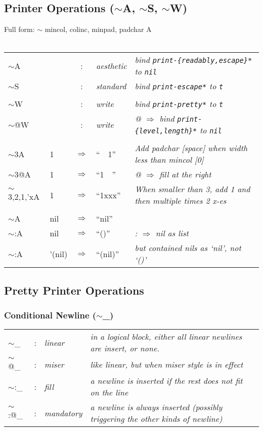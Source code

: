 \documentclass{article}
\begin{document}
\subsection{Printer Operations ($\sim$A, $\sim$S, $\sim$W)}
Full form: $\sim$ mincol, colinc, minpad, padchar A \\
\\
\begin{tabular}{llcll}
  $\sim$A   &    & : &   {\em aesthetic} & {\em bind {\tt *print-\{readably,escape\}*} to {\tt nil}} \\
  $\sim$S   &    & : &   {\em standard} & {\em bind {\tt *print-escape*} to {\tt t}} \\
\\
  $\sim$W   &    & : &   {\em write} & {\em bind {\tt *print-pretty*} to {\tt t}} \\
  $\sim$@W  &    & : &   {\em write} & {\em @ $\Rightarrow$ bind {\tt *print-\{level,length\}*} to {\tt nil}} \\
\\
  $\sim$3A   & 1 & $\Rightarrow$   & ``~~1'' & {\em Add {\em padchar} [space] when width less than {\em mincol} [0]} \\
  $\sim$3@A  & 1 & $\Rightarrow$   & ``1~~'' & {\em @ $\Rightarrow$ fill at the right} \\
  $\sim$3,2,1,'xA & 1 & $\Rightarrow$ & ``1xxx'' & {\em When smaller than 3, add 1 and then multiple times 2 {\em x}-es} \\
\\
  $\sim$A   & nil & $\Rightarrow$   & ``nil'' \\
  $\sim$:A  & nil & $\Rightarrow$   & ``()'' & {\em : $\Rightarrow$ nil as list} \\
  $\sim$:A  & '(nil) & $\Rightarrow$ & ``(nil)'' & {\em but contained nils as `nil', not `()'} \\
\end{tabular}


\subsection{Pretty Printer Operations}

\subsubsection{Conditional Newline ($\sim$\_)}
\begin{tabular}{lllll}
  $\sim$\_   & : & {\em linear} &
    {\em in a logical block, either all {\em linear} newlines are insert, or none.} \\
  $\sim$@\_  & : & {\em miser} & 
    {\em like {\em linear}, but when {\em miser style} is in effect} \\
  $\sim$:\_  & : & {\em fill} & {\em a newline is inserted if the
     rest does not fit on the line} \\
  $\sim$:@\_ & : & {\em mandatory} &
    {\em a newline is always inserted (possibly triggering the other kinds of newline)}\\
\end{tabular}
\end{document}
